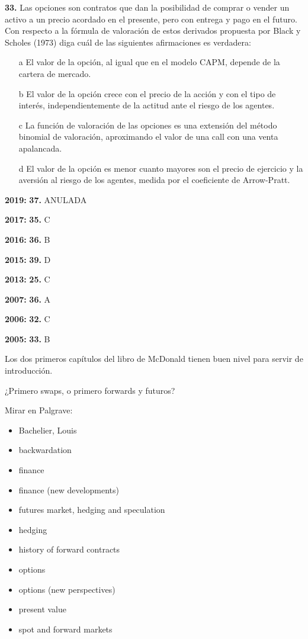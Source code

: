 \documentclass{nuevotema}
\begin{document}
\textbf{33.} Las opciones son contratos que dan la posibilidad de comprar o vender un activo a un precio acordado en el presente, pero con entrega y pago en el futuro. Con respecto a la fórmula de valoración de estos derivados propuesta por Black y Scholes (1973) diga cuál de las siguientes afirmaciones es verdadera:

\begin{itemize}
	\item[a] El valor de la opción, al igual que en el modelo CAPM, depende de la cartera de mercado.
	\item[b] El valor de la opción crece con el precio de la acción y con el tipo de interés, independientemente de la actitud ante el riesgo de los agentes.
	\item[c] La función de valoración de las opciones es una extensión del método binomial de valoración, aproximando el valor de una call con una venta apalancada.
	\item[d] El valor de la opción es menor cuanto mayores son el precio de ejercicio y la aversión al riesgo de los agentes, medida por el coeficiente de Arrow-Pratt.
\end{itemize}

\notas

\textbf{2019:} \textbf{37.} ANULADA

\textbf{2017:} \textbf{35.} C

\textbf{2016:} \textbf{36.} B

\textbf{2015:} \textbf{39.} D

\textbf{2013:} \textbf{25.} C

\textbf{2007:} \textbf{36.} A

\textbf{2006:} \textbf{32.} C

\textbf{2005:} \textbf{33.} B

Los dos primeros capítulos del libro de McDonald tienen buen nivel para servir de introducción.

¿Primero swaps, o primero forwards y futuros?


\bibliografia

Mirar en Palgrave:
\begin{itemize}
	\item Bachelier, Louis
	\item backwardation
    \item finance
    \item finance (new developments)
    \item futures market, hedging and speculation
    \item hedging
    \item history of forward contracts
    \item options
    \item options (new perspectives)
    \item present value
    \item spot and forward markets
\end{itemize}
\end{document}
